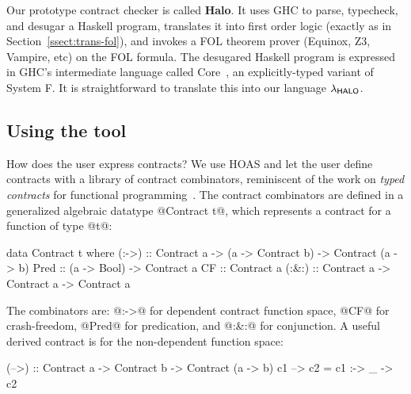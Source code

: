 Our prototype contract checker is called \textbf{Halo}.
It uses GHC to parse, typecheck, and desugar a Haskell program,
translates it into first order logic (exactly as in Section~\ref{ssect:trans-fol}), and
invokes a FOL theorem prover (Equinox, Z3, Vampire, etc) on the FOL formula.
The desugared Haskell program is expressed in GHC's intermediate language
called Core~\cite{Sulzmann:2007:SFT:1190315.1190324}, an explicitly-typed 
variant of System F.  It is straightforward
to translate this into our language $\lambda_{\sf HALO}$.

\subsection{Using the tool}

How does the user express contracts? We use HOAS and let the user
define contracts with a library of contract combinators, reminiscent 
of the work on {\em typed contracts} for functional 
programming~\cite{Hinze:2006:TCF:2100071.2100093}.
The contract combinators are defined in a generalized algebraic 
datatype @Contract t@, which represents a contract for a function of type @t@:
\begin{code}
data Contract t where
  (:->) :: Contract a 
        -> (a -> Contract b)
        -> Contract (a -> b)
  Pred  :: (a -> Bool) -> Contract a
  CF    :: Contract a
  (:&:) :: Contract a -> Contract a -> Contract a
\end{code}
The combinators are: @:->@ for dependent contract function space, @CF@
for crash-freedom, @Pred@ for predication, and
@:&:@ for conjunction. A useful derived contract is for the 
non-dependent function space:
\par {\small
\begin{code}
(-->) :: Contract a -> Contract b -> Contract (a -> b)
c1 --> c2 = c1 :-> \_ -> c2
\end{code}
} \par
%
%

